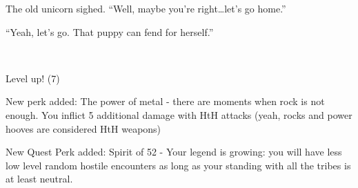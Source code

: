 The old unicorn sighed. ``Well, maybe you're right\dots let's go home.''

``Yeah, let's go. That puppy can fend for herself.''

~\vfill

\begin{engnote}
    Level up! (7)
    
    New perk added: The power of metal - there are moments when rock is not enough. You inflict 5 additional damage with HtH attacks (yeah, rocks and power hooves are considered HtH weapons)
    
    New Quest Perk added: Spirit of 52 - Your legend is growing: you will have less low level random hostile encounters as long as your standing with all the tribes is at least neutral.
\end{engnote}



